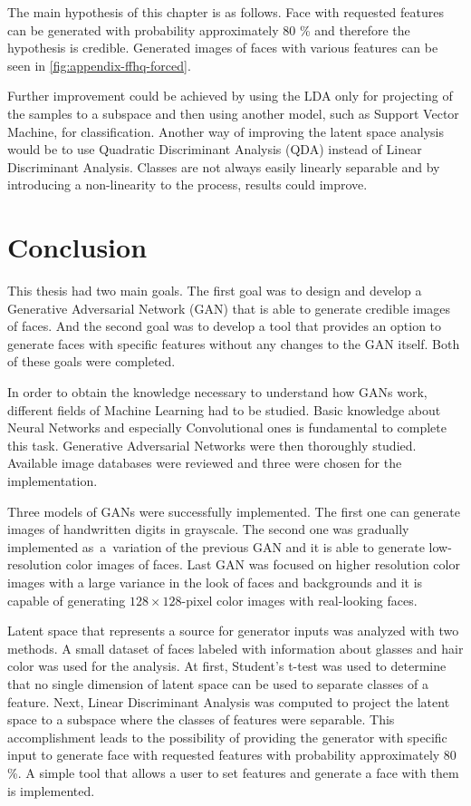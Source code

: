 The main hypothesis of this chapter is as follows.  Face with requested features can be generated with probability approximately 80 \% and therefore the hypothesis is credible. Generated images of faces with various features can be seen in \autoref{fig:appendix-ffhq-forced}.

Further improvement could be achieved by using the LDA only for projecting of the samples to a subspace and then using another model, such as Support Vector Machine, for classification. Another way of improving the latent space analysis would be to use Quadratic Discriminant Analysis (QDA) instead of Linear Discriminant Analysis. Classes are not always easily linearly separable and by introducing a non-linearity to the process, results could improve.

\chapter{Conclusion}
This thesis had two main goals. The first goal was to design and develop a Generative Adversarial Network (GAN) that is able to generate credible images of faces. And the second goal was to develop a tool that provides an option to generate faces with specific features without any changes to the GAN itself. Both of these goals were completed.

In order to obtain the knowledge necessary to understand how GANs work, different fields of Machine Learning had to be studied. Basic knowledge about Neural Networks and especially Convolutional ones is fundamental to complete this task. Generative Adversarial Networks were then thoroughly studied. Available image databases were reviewed and three were chosen for the implementation.

Three models of GANs were successfully implemented. The first one can generate images of handwritten digits in grayscale. The second one was gradually implemented as~a~variation of the previous GAN and it is able to generate low-resolution color images of faces. Last GAN was focused on higher resolution color images with a large variance in the look of faces and backgrounds and it is capable of generating $128 \times 128$-pixel color images with real-looking faces. 

Latent space that represents a source for generator inputs was analyzed with two methods. A small dataset of faces labeled with information about glasses and hair color was used for the analysis. At first, Student's t-test was used to determine that no single dimension of latent space can be used to separate classes of a feature. Next, Linear Discriminant Analysis was computed to project the latent space to a subspace where the classes of features were separable. This accomplishment leads to the possibility of providing the generator with specific input to generate face with requested features with probability approximately 80 \%. A simple tool that allows a user to set features and generate a face with them is implemented.

